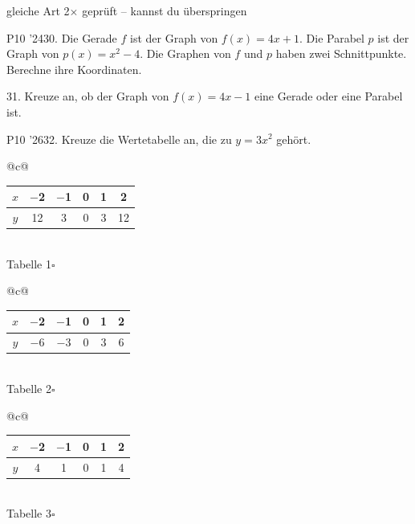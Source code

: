 \documentclass[11pt]{article}
\begin{document}
\begin{pfbuendel}{gleiche Art \textperiodcentered{} 2$\times$ geprüft – kannst du überspringen}
\end{pfbuendel}
\pfgruppe{}
\begin{pfaufg}{P10 ’24}{\llap{\textasteriskcentered\,}30.}{}
Die Gerade $f$ ist der Graph von $f(x) = 4x + 1$. Die Parabel $p$ ist der Graph von $p(x) = x^2 - 4$. Die Graphen von $f$ und $p$ haben zwei Schnittpunkte. Berechne ihre Koordinaten.
\end{pfaufg}
\pfgruppe{}
\begin{pfaufg}{}{31.}{}
Kreuze an, ob der Graph von $f(x) = 4x - 1$ eine Gerade oder eine Parabel ist.
\end{pfaufg}
\pfgruppe{}
\begin{pfaufg}{P10 ’26}{32.}{}
Kreuze die Wertetabelle an, die zu $y = 3x^2$ gehört.
\par\smallskip\noindent \begin{tabular}[t]{@{}c@{}}\renewcommand{\arraystretch}{1.3}\begin{tabular}{|c|c|c|c|c|c|}\hline $x$ & $-$2 & $-$1 & 0 & 1 & 2 \\ \hline $y$ & 12 & 3 & 0 & 3 & 12 \\ \hline\end{tabular}\\[3pt]{\small Tabelle 1\enspace$\square$}\end{tabular}\hspace{0.5cm}\begin{tabular}[t]{@{}c@{}}\renewcommand{\arraystretch}{1.3}\begin{tabular}{|c|c|c|c|c|c|}\hline $x$ & $-$2 & $-$1 & 0 & 1 & 2 \\ \hline $y$ & $-$6 & $-$3 & 0 & 3 & 6 \\ \hline\end{tabular}\\[3pt]{\small Tabelle 2\enspace$\square$}\end{tabular}\hspace{0.5cm}\begin{tabular}[t]{@{}c@{}}\renewcommand{\arraystretch}{1.3}\begin{tabular}{|c|c|c|c|c|c|}\hline $x$ & $-$2 & $-$1 & 0 & 1 & 2 \\ \hline $y$ & 4 & 1 & 0 & 1 & 4 \\ \hline\end{tabular}\\[3pt]{\small Tabelle 3\enspace$\square$}\end{tabular}\par
{}
\end{pfaufg}
\end{document}
